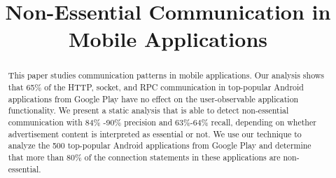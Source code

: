 \documentclass[preprint]{sig-alternate}
\begin{document}

\title{Non-Essential Communication in Mobile Applications}



\maketitle
\begin{abstract}
This paper studies communication patterns in mobile applications.  Our
analysis shows that 65\% of the HTTP, socket, and RPC communication in
top-popular Android applications from Google Play have no effect on
the user-observable application functionality.  We present a static
analysis that is able to detect non-essential communication with 84\%
-90\% precision and 63\%-64\% recall, depending on whether
advertisement content is interpreted as essential or not.  We use our
technique to analyze the 500 top-popular Android applications from
Google Play and determine that more than 80\% of the connection statements
in these applications are non-essential.
\end{abstract}

%


 	







%

%

\end{document}
